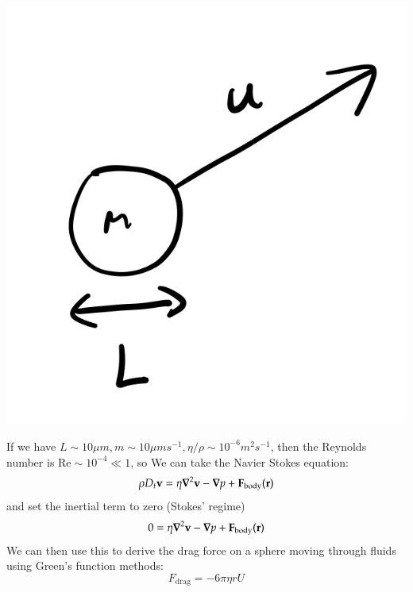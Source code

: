 \begin{center}
    \includegraphics[scale=0.4]{Lectures/Images/lec17-colloid.png}
\end{center}

If we have $L \sim 10\mu\si{m}, m \sim 10\mu\si{m s^{-1}}, \eta/\rho \sim 10^{-6}\si{m^2s^{-1}}$, then the Reynolds number is $\text{Re} \sim 10^{-4} \ll 1$, so We can take the Navier Stokes equation:
\begin{equation}
    \rho D_t\v{v} = \eta \nabla^2 \v{v} - \nabla p + \v{F}_{\text{body}}(\v{r})
\end{equation}
and set the inertial term to zero (Stokes' regime)
\begin{equation}
    0 = \eta \nabla^2 \v{v} - \nabla p + \v{F}_{\text{body}}(\v{r})
\end{equation}
We can then use this to derive the drag force on a sphere moving through fluids using Green's function methods:
\begin{equation}
    F_{\text{drag}} = -6\pi \eta r U
\end{equation}

